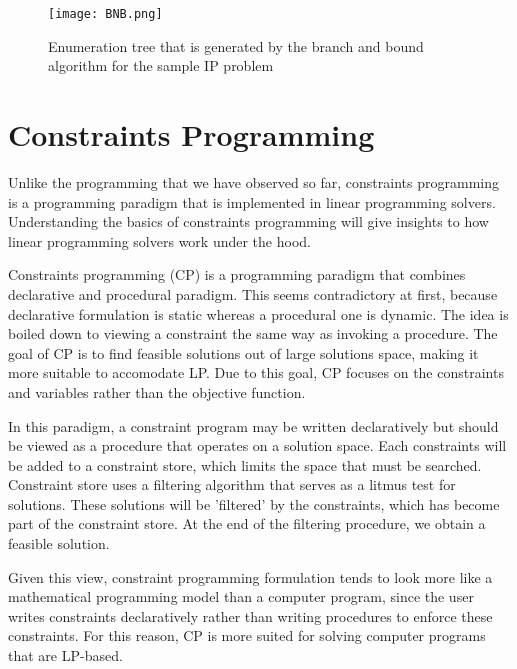 \begin{figure}[!ht]
  \centering
    \texttt{[image: BNB.png]}
    \caption{Enumeration tree that is generated by the branch and bound algorithm for the sample IP problem}
\end{figure}

\section{Constraints Programming}
Unlike the programming that we have observed so far, constraints programming is a programming paradigm that is implemented
in linear programming solvers. Understanding the basics of constraints programming will give insights to how linear programming
solvers work under the hood.

Constraints programming (CP) is a programming paradigm that combines declarative and procedural paradigm. This seems contradictory
at first, because declarative formulation is static whereas a procedural one is dynamic. The idea is boiled down to viewing
a constraint the same way as invoking a procedure. The goal of CP is to find feasible solutions out of large solutions space, making it
more suitable to accomodate LP. Due to this goal, CP focuses on the constraints and variables rather than the objective function.

In this paradigm, a constraint program may be written declaratively but should be viewed as a procedure that operates on a
solution space. Each constraints will be added to a constraint store, which limits the space that must be searched.
Constraint store uses a filtering algorithm that serves as a litmus test for solutions. These solutions will be 'filtered'
by the constraints, which has become part of the constraint store. At the end of the filtering procedure, we obtain a feasible solution.

Given this view, constraint programming formulation tends to look
more like a mathematical programming model than a computer program, since the user writes constraints declaratively
rather than writing procedures to enforce these constraints. For this reason, CP is more suited for solving computer programs that are
LP-based.
